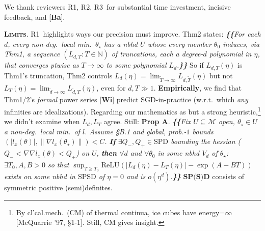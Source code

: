 \documentclass[12pt]{colt2021} %
\newcommand{\Ra}{\textmd{\textsf{\color{purple!50} {R1}}}}
\newcommand{\Rb}{\textmd{\textsf{\color{green!60}  {R2}}}}
\newcommand{\Rc}{\textmd{\textsf{\color{blue!50}   {R3}}}}
\newcommand{\Mm}{\mathcal{M}}
\newcommand{\NN}{\mathbb{N}}
\newcommand{\RR}{\mathbb{R}}
\newcommand{\pag}[1]{\textmd{{\color{gray}Pg}{#1}}}
\newcommand{\pgph}[1]{\textmd{{\color{gray}Par}{#1}}}
\newcommand{\thm}[1]{\textmd{{\color{gray}Thm}{#1}}}
\newcommand{\cit}[1]{[\textbf{#1}]}
\newcommand{\moosect}[1]{\par\noindent\hspace{-1cm}\textsc{\textbf{#1}}.}
\begin{document}
\title{}

    \newcommand{\LaT}{\Lambda_{\text{\tiny\VarClock}}}
    \newcommand{\Lad}{\Lambda_{\text{\tiny\Thermo{4}}}}

    \noindent
    We thank reviewers \Ra, \Rb, \Rc\ for substantial time investment, incisive feedback, and \cit{Ba}. 

\moosect{Limits}
    \Ra\ highlights ways our precision must improve. %
    \thm{2} states:
    \emph{\textbf{\{\!\{}For each $d$, every non-deg.\ local min.\ $\theta_\star$ has a nbhd $U$
        whose every member $\theta_0$ induces, via \thm{1}, a
        sequence $(L_{d,T} : T\in\NN)$ of truncations, each a degree-$d$ polynomial
        in $\eta$, that converges ptwise 
        as $T\to \infty$ to some polynomial $L_d$.\textbf{\}\!\}}}
    \noindent
    So if $L_{d,T}(\eta)$ is \thm{1}'s truncation, \thm{2} controls $L_d(\eta)
    = \lim_{\tilde T\to\infty} L_{d,\tilde T}(\eta)$ but not $L_T(\eta) =
    \lim_{\tilde d\to\infty} L_{\tilde d,T}(\eta)$, even for $d,T\gg 1$. 
    \textbf{Empirically}, we find that \thm{1/2}'s \emph{formal} power series
    \cit{Wi} predict SGD-in-practice (w.r.t.\ which \emph{any} infinities are
    idealizations).   
    Regarding our mathematics as but a strong
    heuristic,\footnote{%
        By cl'cal.mech.\ (CM) of thermal continua, ice cubes have
        energy=$\infty$ [McQuarrie '97, \S{1-1}].
        Still, CM gives insight.
    } we didn't examine when 
    $L_d, L_T$ agree.  
    Still:
    \textbf{Prop A}.\emph{
    \textbf{\{\!\{}Fix $U\subseteq \Mm$ open, %
        $\theta_\star\in U$ a non-deg.\ local min.\ of $l$.
        Assume \S{B.1} and global, prob.-$1$ bounds $(|l_x(\theta)|,\|\nabla
        l_x(\theta_\star)\|)<C$.
        \textbf{If} $\exists Q_-,Q_+\in \text{SPD}$ bounding the hessian
        ($Q_- < \nabla\nabla l_x(\theta)<Q_+$) on $U$,
        \textbf{then} $\forall d$ and $\forall\theta_0$ in
        some nbhd $V_d$ of $\theta_\star$: $\exists T_0,A,B>0$ 
        so that
        $\sup_{T\geq T_0} \text{ReLU}(|L_d(\eta)-L_T(\eta)|-\exp(A-BT))$
        exists on some nbhd in $\text{SPSD}$ of
        $\eta=0$ and is
        $o(\eta^d)$.\textbf{\}\!\}}
    }
    $\textbf{SP(S)D}$ consists of symmetric positive
    (semi)definites.
\end{document}
